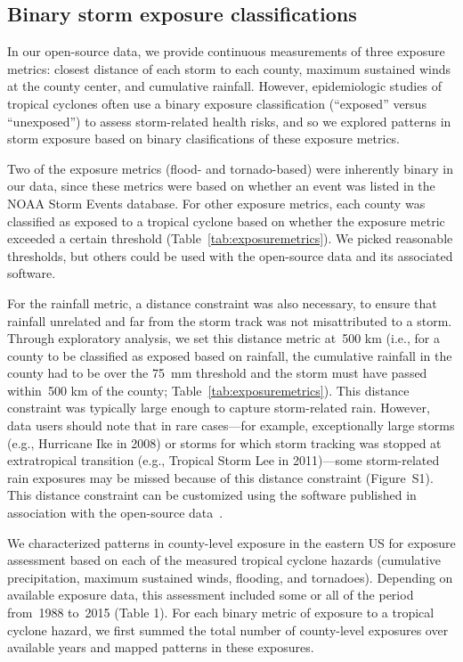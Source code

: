 \subsection*{Binary storm exposure classifications}

In our open-source data, we provide continuous measurements of three exposure
metrics: closest distance of each storm to each county, maximum sustained winds
at the county center, and cumulative rainfall. However, epidemiologic studies
of tropical cyclones often use a binary exposure classification (``exposed''
versus ``unexposed'') to assess storm-related health risks, and so we
explored patterns in storm exposure based on binary clasifications of
these exposure metrics. 

Two of the exposure metrics (flood- and tornado-based) were inherently binary
in our data, since these metrics were based on whether an event was listed in
the NOAA Storm Events database.  For other exposure metrics, each county
was classified as exposed to a tropical cyclone based on whether the exposure
metric exceeded a certain threshold (Table~\ref{tab:exposuremetrics}). We
picked reasonable thresholds, but others could be used with the open-source
data and its associated software. 

For the rainfall metric, a distance constraint was also necessary, to ensure
that rainfall unrelated and far from the storm track was not misattributed to a
storm. Through exploratory analysis, we set this distance metric at~500
\si{\kilo\metre} (i.e., for a county to be classified as exposed based on
rainfall, the cumulative rainfall in the county had to be over the
75~\si{\milli\metre} threshold and the storm must have passed within~500
\si{\kilo\metre} of the county; Table~\ref{tab:exposuremetrics}). This distance
constraint was typically large enough to capture storm-related rain.  However,
data users should note that in rare cases---for example, exceptionally large
storms (e.g., Hurricane Ike in 2008) or storms for which storm tracking was
stopped at extratropical transition (e.g., Tropical Storm Lee in 2011)---some
storm-related rain exposures may be missed because of this distance constraint
(Figure~S1). This distance constraint can be customized using the software
published in association with the open-source
data~\parencite{hurricaneexposure}.

We characterized patterns in county-level exposure in the eastern \ac{US} for
exposure assessment based on each of the measured tropical cyclone hazards
(cumulative precipitation, maximum sustained winds, flooding, and tornadoes).
Depending on available exposure data, this assessment included some or all of
the period from~1988 to~2015 (Table 1). For each binary metric of exposure to a
tropical cyclone hazard, we first summed the total number of county-level
exposures over available years and mapped patterns in
these exposures. 

